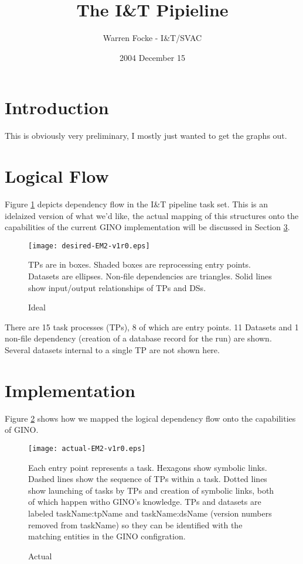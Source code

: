 \documentclass{article}
\begin{document}
\title{The I\&T Pipieline}
\author{Warren Focke - I\&T/SVAC}
\date{2004 December 15}
\maketitle


\section{Introduction}
\label{intro-sec}

This is obviously very preliminary, I mostly just wanted to get the graphs
out.


\section{Logical Flow}
\label{logic-sec}

Figure \ref{desired-fig} depicts dependency flow in the I\&T pipeline task set.
This is an idelaized version of what we'd like, the actual mapping of this
structures onto the capabilities of the current GINO implementation will be
discussed in Section \ref{implement-sec}.

\begin{figure}
\label{desired-fig}
\caption{Ideal}

\texttt{[image: desired-EM2-v1r0.eps]}

{TPs are in boxes. Shaded boxes are reprocessing entry points.  Datasets are
ellipses. Non-file dependencies are triangles.  Solid lines show input/output
relationships of TPs and DSs.}

\end{figure}

There are 15 task processes (TPs), 8 of which are entry points.  11 Datasets
and 1 non-file dependency (creation of a database record for the run) are
shown.  Several datasets internal to a single TP are not shown here.




\section{Implementation}
\label{implement-sec}

Figure \ref{actual-fig} shows how we mapped the logical dependency flow onto
the capabilities of GINO.

\begin{figure}
\label{actual-fig}
\caption{Actual}

\texttt{[image: actual-EM2-v1r0.eps]}

{Each entry point represents a task.  Hexagons show symbolic links. Dashed
lines show the sequence of TPs within a task.  Dotted lines show launching of
tasks by TPs and creation of symbolic links, both of which happen witho GINO's
knowledge.  TPs and datasets are labeled taskName:tpName and taskName:dsName
(version numbers removed from taskName) so they can be identified with the
matching entities in the GINO configration.}

\end{figure}
\end{document}
